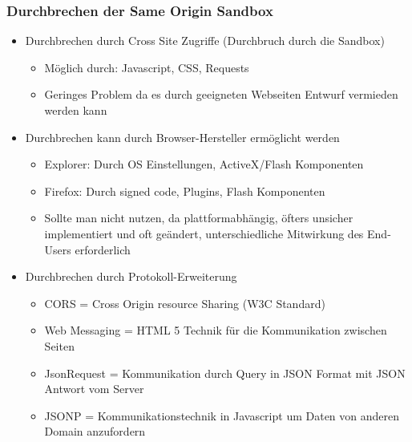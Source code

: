 \documentclass{article} %
\begin{document}
	\subsubsection{Durchbrechen der Same Origin Sandbox}
	\begin{itemize}
		\item Durchbrechen durch Cross Site Zugriffe (Durchbruch durch die Sandbox)
		\begin{itemize} 
			\item Möglich durch: Javascript, CSS, Requests
			\item Geringes Problem da es durch geeigneten Webseiten Entwurf vermieden werden kann
		\end{itemize}
		\item Durchbrechen kann durch Browser-Hersteller ermöglicht werden
		\begin{itemize}
			\item Explorer: Durch OS Einstellungen, ActiveX/Flash Komponenten
			\item Firefox: Durch signed code, Plugins, Flash Komponenten
			\item Sollte man nicht nutzen, da plattformabhängig, öfters unsicher implementiert und oft geändert, unterschiedliche Mitwirkung des End-Users erforderlich
		\end{itemize}
		\item Durchbrechen durch Protokoll-Erweiterung
		\begin{itemize}
			\item CORS = Cross Origin resource Sharing (W3C Standard)
			\item Web Messaging = HTML 5 Technik für die Kommunikation zwischen Seiten
			\item JsonRequest = Kommunikation durch Query in JSON Format mit JSON Antwort vom Server
			\item JSONP = Kommunikationstechnik in Javascript um Daten von anderen Domain anzufordern
		\end{itemize}
	\end{itemize}
\end{document}
